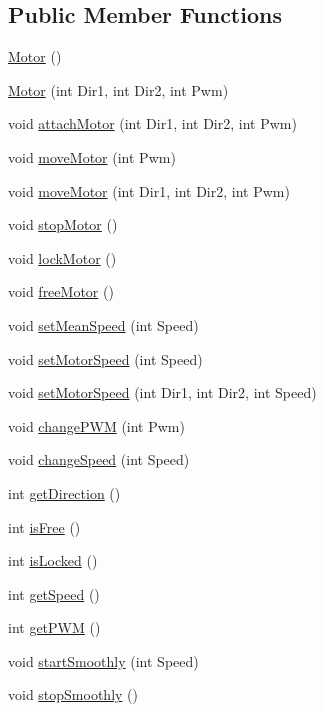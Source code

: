 \subsection*{Public Member Functions}
\begin{DoxyCompactItemize}
\item 
\hyperlink{class_motor_af6106b4c506411265c5face762b6c004}{Motor} ()
\item 
\hyperlink{class_motor_af7bad7a60264d47a368216d72704d838}{Motor} (int Dir1, int Dir2, int Pwm)
\item 
void \hyperlink{class_motor_a6726cda4183f9b9f4fd3d8af52d9e87d}{attach\+Motor} (int Dir1, int Dir2, int Pwm)
\item 
void \hyperlink{class_motor_a81fada8275a8cd70805a9808314e7bee}{move\+Motor} (int Pwm)
\item 
void \hyperlink{class_motor_a06b855952ba7034f260063b6d94c4b3a}{move\+Motor} (int Dir1, int Dir2, int Pwm)
\item 
void \hyperlink{class_motor_a17eb92ef52d3cb10bc9f6b88b7c34dcc}{stop\+Motor} ()
\item 
void \hyperlink{class_motor_ad94e80f3e3918fa6aed53744f3339d0c}{lock\+Motor} ()
\item 
void \hyperlink{class_motor_a76845764c398bb11a880080b010e6119}{free\+Motor} ()
\item 
void \hyperlink{class_motor_a468d680ba9e35742dacbb05028944cb3}{set\+Mean\+Speed} (int Speed)
\item 
void \hyperlink{class_motor_a72a29fd8773b5bfea30afc063d879072}{set\+Motor\+Speed} (int Speed)
\item 
void \hyperlink{class_motor_af6e0f394e5d028bdd8cf9ce5e0fed919}{set\+Motor\+Speed} (int Dir1, int Dir2, int Speed)
\item 
void \hyperlink{class_motor_aea0ccda5c88406ca40b2d2283eab9114}{change\+P\+WM} (int Pwm)
\item 
void \hyperlink{class_motor_a6b966366a7a184ae6b3c3227f5d57213}{change\+Speed} (int Speed)
\item 
int \hyperlink{class_motor_a0d8f99a56a3e07f49630e3024be91048}{get\+Direction} ()
\item 
int \hyperlink{class_motor_a17a9259b14a7e71ae625f47ec8ef0178}{is\+Free} ()
\item 
int \hyperlink{class_motor_a7429cc5bd67dd69077008674eda80f2d}{is\+Locked} ()
\item 
int \hyperlink{class_motor_a4d03ea62bd9f5579d4fbe16d10462962}{get\+Speed} ()
\item 
int \hyperlink{class_motor_accde7c9759aaef803f9d5d6d4ec229e6}{get\+P\+WM} ()
\item 
void \hyperlink{class_motor_aba12da45ff90906b5ad4f2a224d5317d}{start\+Smoothly} (int Speed)
\item 
void \hyperlink{class_motor_af69697d5adb51106f4352c481d67fedd}{stop\+Smoothly} ()
\end{DoxyCompactItemize}
